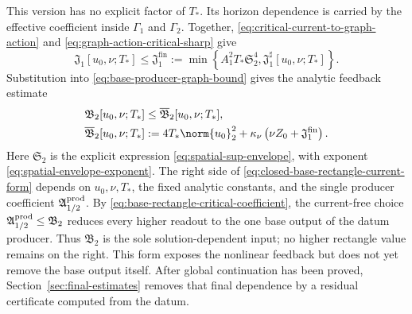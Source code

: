 This version has no explicit factor of \(T_*\).  Its horizon dependence is
carried by the effective coefficient inside \(\Gamma_1\) and \(\Gamma_2\).
Together, \eqref{eq:critical-current-to-graph-action} and
\eqref{eq:graph-action-critical-sharp} give
\begin{equation}
 \mathfrak J_1[u_0,\nu;T_*]
 \le \mathfrak J_1^{\mathrm{fin}}
 :=\min\left\{
 A_1^2T_*\mathfrak S_2^4,
 \mathfrak J_1^{\sharp}[u_0,\nu;T_*]
 \right\}.
 \label{eq:graph-action-best-finite-bound}
\end{equation}
Substitution into \eqref{eq:base-producer-graph-bound} gives the analytic
feedback estimate
\begin{equation}
 \begin{aligned}
 \mathfrak B_2[u_0,\nu;T_*]
 &\le \overline{\mathfrak B}_2[u_0,\nu;T_*],\\
 \overline{\mathfrak B}_2[u_0,\nu;T_*]
 &:=4T_*\norm{u_0}_2^2
 +\kappa_\nu\left(
   \nu Z_0+\mathfrak J_1^{\mathrm{fin}}
  \right).
 \end{aligned}
 \label{eq:closed-base-rectangle-current-form}
\end{equation}
Here \(\mathfrak S_2\) is the explicit expression
\eqref{eq:spatial-sup-envelope}, with exponent
\eqref{eq:spatial-envelope-exponent}.  The right side of
\eqref{eq:closed-base-rectangle-current-form} depends on
\(u_0,\nu,T_*\), the fixed analytic constants, and the single producer
coefficient \(\mathfrak A_{1/2}^{\rm prod}\).  By
\eqref{eq:base-rectangle-critical-coefficient}, the current-free choice
\(\mathfrak A_{1/2}^{\rm prod}\leq\mathfrak B_2\) reduces every higher
readout to the one base output of the datum producer.  Thus
\(\mathfrak B_2\) is the sole solution-dependent input; no higher rectangle
value remains on the right.  This form exposes the nonlinear feedback but does
not yet remove the base output itself.  After global continuation has been
proved, Section~\ref{sec:final-estimates} removes that final dependence by a
residual certificate computed from the datum.

